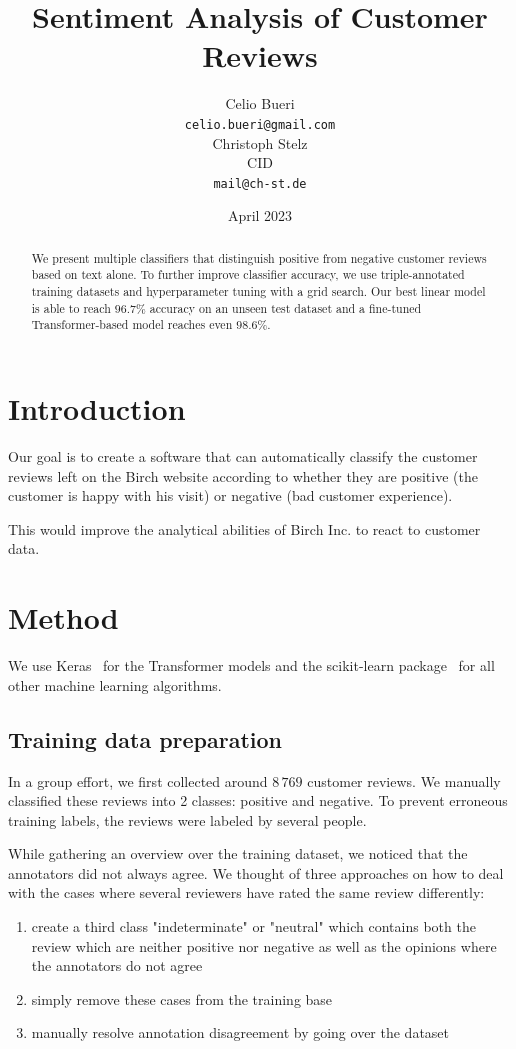 \documentclass[11pt]{article}
\title{Sentiment Analysis of Customer Reviews}
\author{Celio Bueri \\
  {\tt celio.bueri@gmail.com} \\\And
  Christoph Stelz \\
  CID \textttt{stelz} \\
  {\tt mail@ch-st.de} \\}
\date{April 2023}
\begin{document}
\maketitle
\begin{abstract}
We present multiple classifiers that distinguish positive from negative customer reviews based on text alone. To further improve classifier accuracy, we use triple-annotated training datasets and hyperparameter tuning with a grid search. Our best linear model is able to reach $96.7\%$ accuracy on an unseen test dataset and a fine-tuned Transformer-based model reaches even $98.6\%$.
\end{abstract}



\section{Introduction}
Our goal is to create a software that can automatically classify the customer reviews left on the Birch website according to whether they are positive (the customer is happy with his visit) or negative (bad customer experience).

This would improve the analytical abilities of  Birch Inc. to react to customer data.

\section{Method}

We use Keras~\cite{chollet2015keras} for the Transformer models and the scikit-learn package~\cite{scikit-learn} for all other machine learning algorithms.

\subsection{Training data preparation}
In a group effort, we first collected around $8\,769$ customer reviews.
We manually classified these reviews into 2 classes: positive and negative.
To prevent erroneous training labels, the reviews were labeled by several people.


While gathering an overview over the training dataset, we noticed that the annotators did not always agree.
We thought of three approaches on how to deal with the cases where several reviewers have rated the same review differently:

\begin{enumerate}
    \item create a third class "indeterminate" or "neutral" which contains both the review which are neither positive nor negative as well as the opinions where the annotators do not agree
    \item simply remove these cases from the training base
    \item manually resolve annotation disagreement by going over the dataset 
\end{enumerate}
\end{document}
